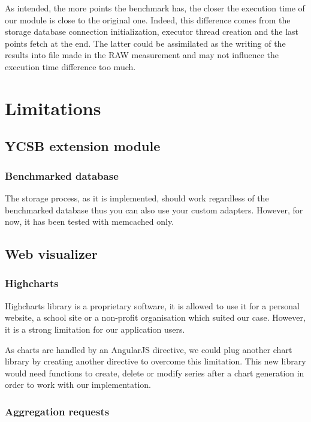 \documentclass[a4paper,11pt]{report}
\begin{document}
\bigskip

As intended, the more points the benchmark has, the closer the execution time of our module is close to the original one. Indeed, this difference comes from the storage database connection initialization, executor thread creation and the last points fetch at the end. The latter could be assimilated as the writing of the results into file made in the RAW measurement and may not influence the execution time difference too much.

\clearpage

\section{Limitations}

\subsection{YCSB extension module}

\subsubsection{Benchmarked database}

The storage process, as it is implemented, should work regardless of the benchmarked database thus you can also use your custom adapters.
However, for now, it has been tested with memcached only.

\subsection{Web visualizer}

\subsubsection{Highcharts}

Highcharts library is a proprietary software, it is allowed to use it for a personal website, a school site or a non-profit organisation which suited our case. However, it is a strong limitation for our application users. 

As charts are handled by an AngularJS directive, we could plug another chart library by creating another directive to overcome this limitation. This new library would need functions to create, delete or modify series after a chart generation in order to work with our implementation.

\subsubsection{Aggregation requests}
\end{document}
